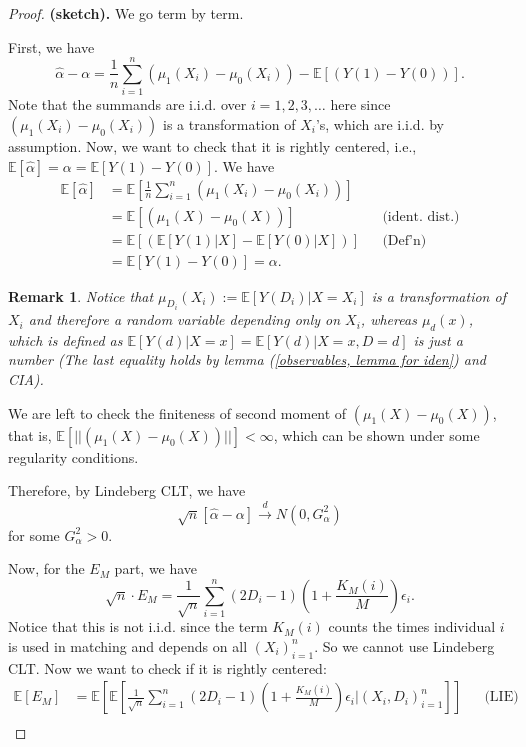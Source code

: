 \documentclass[11pt,a4paper]{amsart}
\theoremstyle{plain}
\newtheorem*{remark*}{Remark}
\theoremstyle{definition}
\begin{document}
	\begin{proof}
		\textbf{(sketch).} We go term by term. \par 
		First, we have
		\[	\hat{\alpha} - \alpha = \frac{1}{n}\sum_{i=1}^{n}\left(\mu_{1}(X_{i})-\mu_{0}(X_{i})\right) - \mathbb{E}[(Y(1)-Y(0))].	\]
		Note that the summands are i.i.d. over $i = 1,2,3, \dots$ here since $\left(\mu_{1}(X_{i})-\mu_{0}(X_{i})\right)$ is a transformation of $X_{i}$'s, which are i.i.d. by assumption. Now, we want to check that it is rightly centered, i.e., $\mathbb{E}[\hat{\alpha}] = \alpha = \mathbb{E}[Y(1)-Y(0)]$. We have 
		\[	\begin{aligned}
		\mathbb{E}[\hat{\alpha}] &= \mathbb{E}[\frac{1}{n}\sum_{i=1}^{n}\left(\mu_{1}(X_{i})-\mu_{0}(X_{i})\right) ]	\\
		&= \mathbb{E}[\left(\mu_{1}(X)-\mu_{0}(X)\right) ] &&\text{(ident. dist.)}	\\
		&= \mathbb{E}[\left(\mathbb{E}[Y(1)|X]-\mathbb{E}[Y(0)|X]\right) ] &&\text{(Def'n)}	\\
		&= \mathbb{E}[Y(1)-Y(0)] = \alpha.
		\end{aligned}	\]
		\begin{remark*}
			Notice that $\mu_{D_{i}}(X_{i}) := \mathbb{E}\left[Y(D_{i})|X=X_{i}\right]$ is a transformation of $X_{i}$ and therefore a random variable depending only on $X_{i}$, whereas $\mu_{d}(x)$, which is defined as $\mathbb{E}\left[Y(d)|X=x\right] =  \mathbb{E}\left[Y(d)|X=x, D=d\right] $ is just a number (The last equality holds by lemma (\ref{observables, lemma for iden}) and CIA). 
		\end{remark*}
		We are left to check the finiteness of second moment of $\left(\mu_{1}(X)-\mu_{0}(X)\right) $, that is, $\mathbb{E}[ || \left(\mu_{1}(X)-\mu_{0}(X)\right) || ] < \infty$, which can be shown under some regularity conditions. \par 
		Therefore, by Lindeberg CLT, we have 
		\[	\sqrt{n}[\hat{\alpha} - \alpha] \stackrel{d}{\longrightarrow} N(0,G_{\alpha}^{2})	\]
		for some $G_{\alpha}^{2} > 0$. \par
		Now, for the $E_{M}$ part, we have 
		\[	\sqrt{n} \cdot E_{M} = \frac{1}{\sqrt{n}} \sum_{i=1}^{n}(2D_{i}-1)(1+\frac{K_{M}(i)}{M})\epsilon_{i}.	\]
		Notice that this is not i.i.d. since the term $K_{M}(i)$ counts the times individual $i$ is used in matching and depends on all $(X_{i})_{i=1}^{n}$. So we cannot use Lindeberg CLT. Now we want to check if it is rightly centered:
		\[	\begin{aligned}
			\mathbb{E}[E_{M} ] &= \mathbb{E}\left[ \mathbb{E}\left[\frac{1}{\sqrt{n}} \sum_{i=1}^{n}(2D_{i}-1)(1+\frac{K_{M}(i)}{M})\epsilon_{i} \big| (X_{i},D_{i})_{i=1}^{n}\right] \right] &&\text{(LIE)}\\

\end{aligned}\]
\end{proof}
\end{document}

